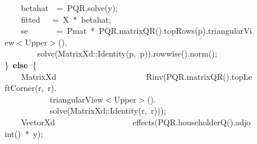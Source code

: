 \documentclass[shortnames,article]{jss}
\newcommand{\hlstd}[1]{\textcolor[rgb]{0,0,0}{#1}}
\newcommand{\hlopt}[1]{\textcolor[rgb]{0,0,0}{#1}}
\newcommand{\hlkwa}[1]{\textcolor[rgb]{0.61,0.13,0.93}{\bf{#1}}}
\newcommand{\hlkwd}[1]{\textcolor[rgb]{0,0,0}{#1}}
\begin{document}
\begin{figure}[htb]
    \hlstd{}\hlstd{\ \ \ \ }\hlstd{betahat}\hlstd{\ \ }\hlstd{}\hlopt{=\ }\hlstd{PQR}\hlopt{.}\hlstd{}\hlkwd{solve}\hlstd{}\hlopt{(}\hlstd{y}\hlopt{);}\hspace*{\fill}\\
    \hlstd{}\hlstd{\ \ \ \ }\hlstd{fitted}\hlstd{\ \ \ }\hlstd{}\hlopt{=\ }\hlstd{X\ }\hlopt{{*}\ }\hlstd{betahat}\hlopt{;}\hspace*{\fill}\\
    \hlstd{}\hlstd{\ \ \ \ }\hlstd{se}\hlstd{\ \ \ \ \ \ \ }\hlstd{}\hlopt{=\ }\hlstd{Pmat\ }\hlopt{{*}\ }\hlstd{PQR}\hlopt{.}\hlstd{}\hlkwd{matrixQR}\hlstd{}\hlopt{().}\hlstd{}\hlkwd{topRows}\hlstd{}\hlopt{(}\hlstd{p}\hlopt{).}\hlstd{triangularView}\hlopt{$<$}\hlstd{Upper}\hlopt{$>$().}\hspace*{\fill}\\
    \hlstd{}\hlstd{\ \ \ \ \ \ \ \ }\hlstd{}\hlkwd{solve}\hlstd{}\hlopt{(}\hlstd{MatrixXd}\hlopt{::}\hlstd{}\hlkwd{Identity}\hlstd{}\hlopt{(}\hlstd{p}\hlopt{,\ }\hlstd{p}\hlopt{)).}\hlstd{}\hlkwd{rowwise}\hlstd{}\hlopt{().}\hlstd{}\hlkwd{norm}\hlstd{}\hlopt{();}\hspace*{\fill}\\
    \hlstd{}\hlopt{\}\ }\hlstd{}\hlkwa{else\ }\hlstd{}\hlopt{\{}\hspace*{\fill}\\
    \hlstd{}\hlstd{\ \ \ \ }\hlstd{MatrixXd}\hlstd{\ \ \ \ \ \ \ \ \ \ \ \ \ \ \ \ \ \ \ \ \ \ }\hlstd{}\hlkwd{Rinv}\hlstd{}\hlopt{(}\hlstd{PQR}\hlopt{.}\hlstd{}\hlkwd{matrixQR}\hlstd{}\hlopt{().}\hlstd{}\hlkwd{topLeftCorner}\hlstd{}\hlopt{(}\hlstd{r}\hlopt{,\ }\hlstd{r}\hlopt{).}\hspace*{\fill}\\
    \hlstd{}\hlstd{\ \ \ \ \ \ \ \ \ \ \ }\hlstd{triangularView}\hlopt{$<$}\hlstd{Upper}\hlopt{$>$().}\hspace*{\fill}\\
    \hlstd{}\hlstd{\ \ \ \ \ \ \ \ \ \ \ }\hlstd{}\hlkwd{solve}\hlstd{}\hlopt{(}\hlstd{MatrixXd}\hlopt{::}\hlstd{}\hlkwd{Identity}\hlstd{}\hlopt{(}\hlstd{r}\hlopt{,\ }\hlstd{r}\hlopt{)));}\hspace*{\fill}\\
    \hlstd{}\hlstd{\ \ \ \ }\hlstd{VectorXd}\hlstd{\ \ \ \ \ \ \ \ \ \ \ \ \ \ \ \ \ \ \ }\hlstd{}\hlkwd{effects}\hlstd{}\hlopt{(}\hlstd{PQR}\hlopt{.}\hlstd{}\hlkwd{householderQ}\hlstd{}\hlopt{().}\hlstd{}\hlkwd{adjoint}\hlstd{}\hlopt{()\ {*}\ }\hlstd{y}\hlopt{);}\hspace*{\fill}\\

\end{figure}
\end{document}
